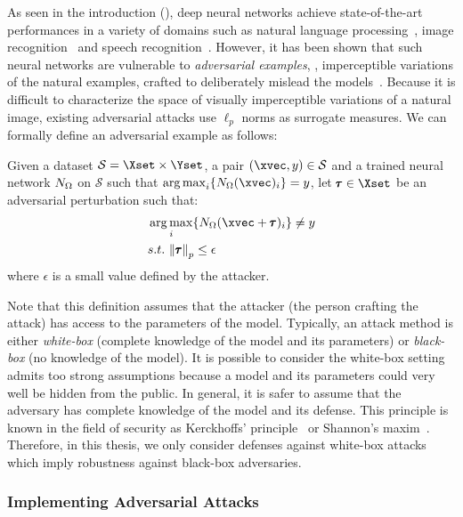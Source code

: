As seen in the introduction (), deep neural networks achieve state-of-the-art performances in a variety of domains such as natural language processing~\cite{radford2018Language}, image recognition~\cite{he2016deep} and speech recognition~\cite{hinton2012deep}.
However, it has been shown that such neural networks are vulnerable to \emph{adversarial examples}, \ie, imperceptible variations of the natural examples, crafted to deliberately mislead the models~\cite{globerson2006nightmare,biggio2013evasion,szegedy2013intriguing}.
Because it is difficult to characterize the space of visually imperceptible variations of a natural image, existing adversarial attacks use $\ell_p$ norms as surrogate measures.
We can formally define an adversarial example as follows:
\begin{definition}
  Given a dataset $\mathcal{S} = \Xset \times \Yset$, a pair $(\xvec, y) \in \mathcal{S}$ and a trained neural network $N_\Omega$ on $\mathcal{S}$ such that $\argmax_{i} \{ \nn_\weights(\xvec)_i \} = y$, let $\adv \in \Xset$ be an adversarial perturbation such that:
  \begin{align}
    &\argmax_{i} \{ \nn_\weights (\xvec + \adv)_i \} \neq y \\
    &\st\ \norm{\adv}_p \leq \epsilon \notag
  \end{align}
  where $\epsilon$ is a small value defined by the attacker. 
\end{definition}

Note that this definition assumes that the attacker (the person crafting the attack) has access to the parameters of the model.
Typically, an attack method is either \emph{white-box} (complete knowledge of the model and its parameters) or \emph{black-box} (no knowledge of the model).
It is possible to consider the white-box setting admits too strong assumptions because a model and its parameters could very well be hidden from the public.
In general, it is safer to assume that the adversary has complete knowledge of the model and its defense.
This principle is known in the field of security as Kerckhoffs’ principle~\cite{kerckhoffs1883cryptographie} or Shannon's maxim~\cite{shannon1949communication}.
Therefore, in this thesis, we only consider defenses against white-box attacks which imply robustness against black-box adversaries.  


\subsubsection{Implementing Adversarial Attacks}
\label{subsubsection:ch2-adversarial_attacks}

